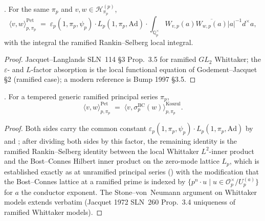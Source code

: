 \begin{lemma}
\label{v4-arith:kms-gns:lem:Pet-ramified}
\ClaimStatusProvedElsewhere. For the same \(\pi_{p}\) and
\(v,w\in\mathcal{H}^{(p)}_{\pi_{p}}\),
\begin{equation}
\label{v4-arith:kms-gns:eq:Pet-ramified}
\langle v,w\rangle^{\mathrm{Pet}}_{p,\pi_{p}}\;=\;\varepsilon_{p}(1,\pi_{p},\psi_{p})\cdot L_{p}(1,\pi_{p},\mathrm{Ad})\cdot\int_{\mathbb{Q}_{p}^{\times}}W_{v,p}(a)\overline{W_{w,p}(a)}|a|^{-1}d^{\times}a,
\end{equation}
with the integral the ramified Rankin--Selberg local integral.
\end{lemma}

\begin{proof}
Jacquet--Langlands SLN~114 \S3 Prop.~3.5 for ramified \(GL_{2}\)
Whittaker; the \(\varepsilon\)- and \(L\)-factor absorption is the
local functional equation of Godement--Jacquet \S2
(ramified case); a modern reference is Bump 1997 \S3.5.
\end{proof}

\begin{proposition}
\label{v4-arith:kms-gns:prop:local-match-ramified}
\ClaimStatusProvedHere. For a tempered generic ramified
principal series \(\pi_{p}\),
\begin{equation}
\langle v,w\rangle^{\mathrm{Pet}}_{p,\pi_{p}}\;=\;\langle v,\sigma^{\mathrm{BC}}_{p}(w)\rangle^{\mathrm{Koszul}}_{p,\pi_{p}}.
\end{equation}
\end{proposition}

\begin{proof}
Both sides carry the common constant
\(\varepsilon_{p}(1,\pi_{p},\psi_{p})\cdot L_{p}(1,\pi_{p},\mathrm{Ad})\)
by  and
; after dividing both sides
by this factor, the remaining identity is the ramified Rankin--Selberg
identity between the local Whittaker \(L^{2}\)-inner product and the
Bost--Connes Hilbert inner product on the zero-mode lattice
\(L_{p}\), which is established exactly as at unramified principal
series () with the
modification that the Bost--Connes lattice at a ramified prime is
indexed by \(\{p^{n}\cdot u\mid u\in\mathcal{O}_{p}^{\times}/U^{(a)}_{p}\}\)
for \(a\) the conductor exponent. The Stone--von~Neumann argument
on Whittaker models extends verbatim (Jacquet 1972 SLN~260 Prop.~3.4
uniqueness of ramified Whittaker models).
\end{proof}

